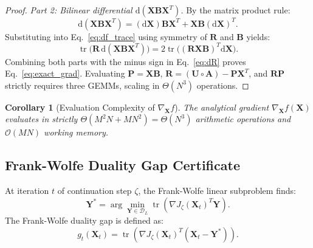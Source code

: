\documentclass[a4paper,fleqn]{cas-dc}
\theoremstyle{thmstyleone}
\newtheorem{corollary}[theorem]{Corollary}
\theoremstyle{thmstyletwo}
\theoremstyle{thmstylethree}
\begin{document}
\begin{proof}
\textit{Part 2: Bilinear differential $\mathrm{d}(\mathbf{X}\mathbf{B}\mathbf{X}^T)$.} By the matrix product rule:
\begin{equation}
\mathrm{d}(\mathbf{X}\mathbf{B}\mathbf{X}^T) = (\mathrm{d}\mathbf{X})\mathbf{B}\mathbf{X}^T + \mathbf{X}\mathbf{B}(\mathrm{d}\mathbf{X})^T.
\end{equation}
Substituting into Eq.~\eqref{eq:df_trace} using symmetry of $\mathbf{R}$ and $\mathbf{B}$ yields:
\begin{equation}
\operatorname{tr}\big(\mathbf{R} \, \mathrm{d}(\mathbf{X}\mathbf{B}\mathbf{X}^T)\big) = 2\operatorname{tr}\big((\mathbf{R}\mathbf{X}\mathbf{B})^T \mathrm{d}\mathbf{X}\big).
\end{equation}
Combining both parts with the minus sign in Eq.~\eqref{eq:dR} proves Eq.~\eqref{eq:exact_grad}. Evaluating $\mathbf{P} = \mathbf{X}\mathbf{B}$, $\mathbf{R} = (\mathbf{U} \circ \mathbf{A}) - \mathbf{P}\mathbf{X}^T$, and $\mathbf{R}\mathbf{P}$ strictly requires three GEMMs, scaling in $\Theta(N^3)$ operations.
\end{proof}

\begin{corollary}[Evaluation Complexity of $\nabla_{\mathbf{X}} f$]
\label{cor:gradient_complexity}
The analytical gradient $\nabla_{\mathbf{X}} f(\mathbf{X})$ evaluates in strictly $\Theta(M^2N + MN^2) = \Theta(N^3)$ arithmetic operations and $\mathcal{O}(MN)$ working memory.
\end{corollary}

\subsection{Frank-Wolfe Duality Gap Certificate}
At iteration $t$ of continuation step $\zeta$, the Frank-Wolfe linear subproblem finds:
\begin{equation}
\mathbf{Y}^* = \arg\min_{\mathbf{Y} \in \mathcal{D}_L} \operatorname{tr}\left( \nabla J_\zeta(\mathbf{X}_t)^T \mathbf{Y} \right).
\label{eq:fw_subproblem}
\end{equation}
The Frank-Wolfe duality gap is defined as:
\begin{equation}
g_t(\mathbf{X}_t) = \operatorname{tr}\left( \nabla J_\zeta(\mathbf{X}_t)^T (\mathbf{X}_t - \mathbf{Y}^*) \right).
\label{eq:duality_gap}
\end{equation}
\end{document}
